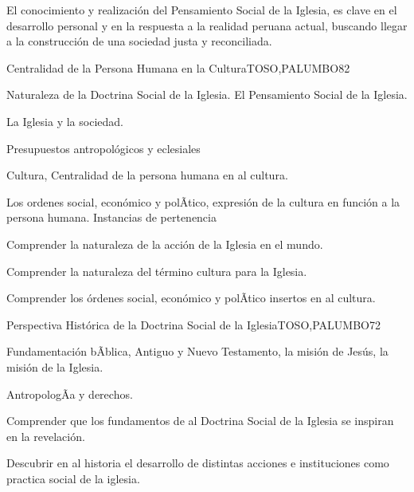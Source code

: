 \begin{syllabus}


\begin{justification}
El conocimiento y realización del Pensamiento Social de la Iglesia, es clave en el desarrollo personal 
y en la respuesta a la realidad peruana actual, buscando llegar a la construcción de una 
sociedad justa y reconciliada.
\end{justification}

\begin{goals}
\item \OutcomeFH
\end{goals}

\begin{outcomes}
\end{outcomes}

\begin{unit}{Centralidad de la Persona Humana en la Cultura}{TOSO,PALUMBO}{8}{2}
\begin{topics}
	\item Naturaleza de la Doctrina Social de la Iglesia.  El Pensamiento Social de la Iglesia.
	\item La Iglesia y la sociedad.
	\item Presupuestos antropológicos y eclesiales
	\item Cultura, Centralidad de la persona humana en al cultura.
	\item Los ordenes social, económico y polÃ­tico, expresión de la cultura en función a la persona humana.  Instancias de pertenencia
\end{topics}
\begin{unitgoals}
	\item Comprender la naturaleza de la acción de la Iglesia en el mundo.
	\item Comprender la naturaleza del término cultura para la Iglesia.
	\item Comprender los órdenes social, económico y polÃ­tico insertos en al cultura.
\end{unitgoals}
\end{unit}

\begin{unit}{Perspectiva Histórica de la Doctrina Social de la Iglesia}{TOSO,PALUMBO}{7}{2}
\begin{topics}
	\item Fundamentación bÃ­blica, Antiguo y Nuevo Testamento, la misión de Jesús, la misión de la Iglesia.
	\item AntropologÃ­a y derechos.
\end{topics}
\begin{unitgoals}
	\item Comprender que los fundamentos de al Doctrina Social de la Iglesia se inspiran en la revelación.
	\item Descubrir en al historia el desarrollo de distintas acciones e instituciones como practica social de la iglesia.
\end{unitgoals}
\end{unit}


\end{syllabus}
